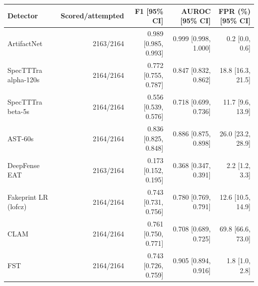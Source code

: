\begin{tabular}{lrrrr}
\toprule
Detector & Scored/attempted & F1 [95\% CI] & AUROC [95\% CI] & FPR (\%) [95\% CI] \\
\midrule
ArtifactNet & 2163/2164 & 0.989 [0.985, 0.993] & 0.999 [0.998, 1.000] & 0.2 [0.0, 0.6] \\
SpecTTTra alpha-120s & 2164/2164 & 0.772 [0.755, 0.787] & 0.847 [0.832, 0.862] & 18.8 [16.3, 21.5] \\
SpecTTTra beta-5s & 2164/2164 & 0.556 [0.539, 0.576] & 0.718 [0.699, 0.736] & 11.7 [9.6, 13.9] \\
AST-60s & 2164/2164 & 0.836 [0.825, 0.848] & 0.886 [0.875, 0.898] & 26.0 [23.2, 28.9] \\
DeepFense EAT & 2163/2164 & 0.173 [0.152, 0.195] & 0.368 [0.347, 0.391] & 2.2 [1.2, 3.3] \\
Fakeprint LR (lofcz) & 2164/2164 & 0.743 [0.731, 0.756] & 0.780 [0.769, 0.791] & 12.6 [10.5, 14.9] \\
CLAM & 2164/2164 & 0.761 [0.750, 0.771] & 0.708 [0.689, 0.725] & 69.8 [66.6, 73.0] \\
FST & 2164/2164 & 0.743 [0.726, 0.759] & 0.905 [0.894, 0.916] & 1.8 [1.0, 2.8] \\
\bottomrule
\end{tabular}
